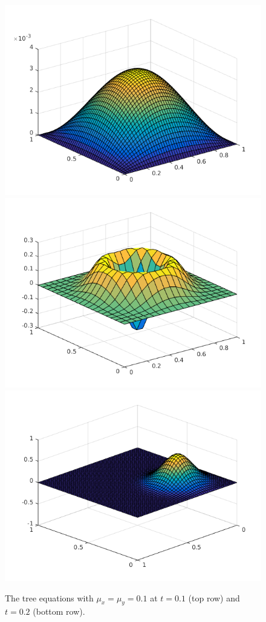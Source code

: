 \begin{figure}
\includegraphics[scale=0.33]{images/heatP4T02.png}
\includegraphics[scale=0.33]{images/waveP4T02.png}
\includegraphics[scale=0.33]{images/transpP4T02.png}
\caption{The tree equations with $\mu_x=\mu_y= 0.1$ at $t = 0.1$ (top row) and $t = 0.2$ (bottom row). }
\label{fig:part4}
\end{figure}



